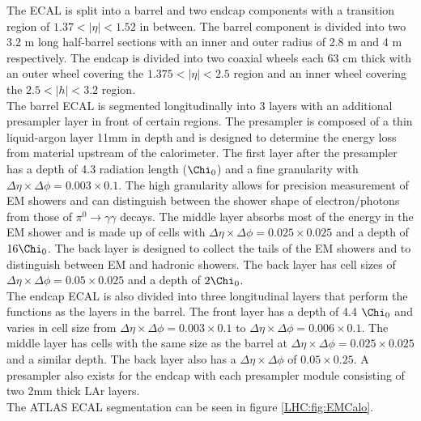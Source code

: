 \indent The ECAL is split into a barrel and two endcap components with a transition region of $1.37 < |\eta| < 1.52$ in between.  The barrel component is divided into two 3.2 m long half-barrel sections with an inner and outer radius of 2.8 m and 4 m respectively.  The endcap is divided into two coaxial wheels each 63 cm thick with an outer wheel covering the $1.375 < |\eta| < 2.5$ region and an inner wheel covering the $2.5 < |h| < 3.2$ region. \\

\indent The barrel ECAL is segmented longitudinally into 3 layers with an additional presampler layer in front of certain regions.  The presampler is composed of a thin liquid-argon layer 11mm in depth and is designed to determine the energy loss from material upstream of the calorimeter.  The first layer after the presampler has a depth of 4.3 radiation length ($\Chi_0$) and a fine granularity with $\Delta\eta \times \Delta\phi = 0.003 \times 0.1$.  The high granularity allows for precision measurement of EM showers and can distinguish between the shower shape of electron/photons from those of $\pi^0\rightarrow \gamma\gamma$ decays.  The middle layer absorbs most of the energy in the EM shower and is made up of cells with $\Delta\eta \times \Delta\phi = 0.025 \times 0.025$ and a depth of $16 \Chi_0$.  The back layer is designed to collect the tails of the EM showers and to distinguish between EM and hadronic showers. The back layer has cell sizes of $\Delta\eta \times \Delta\phi = 0.05 \times 0.025$ and a depth of $2 \Chi_0$.  \\

\indent The endcap ECAL is also divided into three longitudinal layers that perform the functions as the layers in the barrel.  The front layer has a depth of 4.4 $\Chi_0$ and varies in cell size from $\Delta\eta \times \Delta\phi = 0.003 \times 0.1$ to $\Delta\eta \times \Delta\phi = 0.006 \times 0.1$. The middle layer has cells with the same size as the barrel at $\Delta\eta \times \Delta\phi = 0.025 \times 0.025$ and a similar depth. The back layer also has a $\Delta\eta \times \Delta\phi$ of $0.05 \times 0.25$.  A presampler also exists for the endcap with each presampler module consisting of two 2mm thick LAr layers. \\

\indent The ATLAS ECAL segmentation can be seen in figure \ref{LHC:fig:EMCalo}. \\

